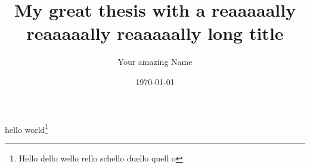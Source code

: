 \documentclass[
	verbose,
	english,
	type=bachelor-thesis, %
	paper=a4,  %
]{thesis}
\title{My great thesis with a reaaaaally reaaaaally reaaaaally long title}
\author{Your amazing Name}
\date{\today}
\begin{document}
	\maketitle
\hideindraft{
	\frontmatter
		\maketitle
	
		
		
	
		\tableofcontents
		\listoffigures
		\listoftables
	}
	
	\mainmatter
	
	
	
	
	
	
	
	hello world\footnote{\the\marginparwidth Hello dello wello rello schello duello quell o} %

	\cite{DBLP:conf/msr/SihlerPSTDD24}

	\backmatter
	\printbibliography

	\makedeclarationofauthenticity %
\end{document}
